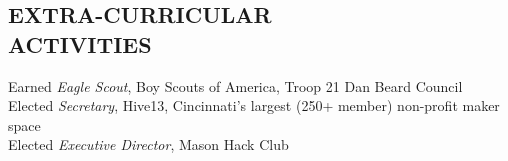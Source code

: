 \documentclass[margin]{res} %
\begin{document}
\begin{resume}

\section{EXTRA-CURRICULAR \\ ACTIVITIES} 

Earned {\it Eagle Scout}, Boy Scouts of America, Troop 21 Dan Beard Council \\
Elected {\it Secretary}, Hive13, Cincinnati's largest (250+ member) non-profit maker space \\
Elected {\it Executive Director}, Mason Hack Club \\


\end{resume}
\end{document}
